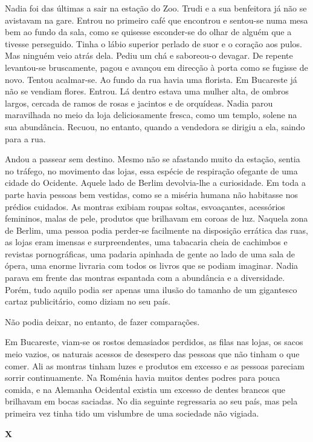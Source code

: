 Nadia foi das últimas a sair na estação do Zoo. Trudi
e a sua benfeitora já não se avistavam na gare. Entrou no primeiro café
que encontrou e sentou-se numa mesa bem ao fundo da sala, como se
quisesse esconder-se do olhar de alguém que a tivesse perseguido. Tinha
o lábio superior perlado de suor e o coração aos pulos. Mas ninguém veio
atrás dela. Pediu um chá e saboreou-o devagar. De repente levantou-se
bruscamente, pagou e avançou em direcção à porta como se fugisse de
novo. Tentou acalmar-se. Ao fundo da rua havia uma florista. Em
Bucareste já não se vendiam flores. Entrou. Lá dentro estava uma mulher
alta, de ombros largos, cercada de ramos de rosas e jacintos e de
orquídeas. Nadia parou maravilhada no meio da loja deliciosamente
fresca, como um templo, solene na sua abundância. Recuou, no entanto,
quando a vendedora se dirigiu a ela, saindo para a rua.


Andou a passear sem destino. Mesmo não se afastando muito da estação,
sentia no tráfego, no movimento das lojas, essa espécie de respiração
ofegante de uma cidade do Ocidente. Aquele lado de Berlim devolvia-lhe a
curiosidade. Em toda a parte havia pessoas bem vestidas, como se a
miséria humana não habitasse nos prédios cuidados. As montras exibiam
roupas soltas, esvoaçantes, acessórios femininos, malas de pele,
produtos que brilhavam em coroas de luz. Naquela zona de Berlim, uma
pessoa podia perder-se facilmente na disposição errática das ruas, as
lojas eram imensas e surpreendentes, uma tabacaria cheia de cachimbos e
revistas pornográficas, uma padaria apinhada de gente ao lado de uma
sala de ópera, uma enorme livraria com todos os livros que se podiam
imaginar. Nadia parava em frente das montras espantada com a
abundância e a diversidade. Porém, tudo aquilo podia ser apenas uma
ilusão do tamanho de um gigantesco cartaz publicitário, como diziam no
seu país.

Não podia deixar, no entanto, de fazer comparações.

Em Bucareste, viam-se os rostos demasiados perdidos, as filas nas lojas,
os sacos meio vazios, os naturais acessos de desespero das pessoas que
não tinham o que comer. Ali as montras tinham luzes e produtos em
excesso e as pessoas pareciam sorrir continuamente. Na Roménia havia
muitos dentes podres para pouca comida, e na Alemanha Ocidental
existia um excesso de dentes brancos que brilhavam em bocas saciadas.
No dia seguinte regressaria ao seu país, mas pela primeira vez tinha
tido um vislumbre de uma sociedade não vigiada.


\pagebreak
\vspace*{1.8cm}
\noindent{}\textbf{X}

